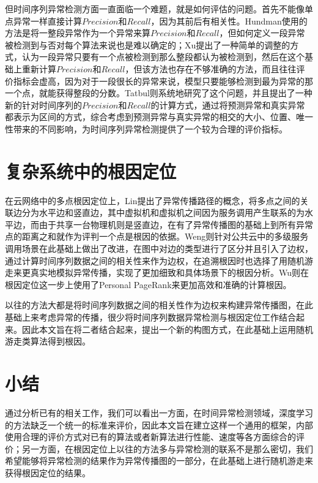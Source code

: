 但时间序列异常检测方面一直面临一个难题，就是如何评估的问题。首先不能像单点异常一样直接计算$Precision$和$Recall$，因为其前后有相关性。Hundman\cite{DBLP:conf/kdd/HundmanCLCS18}使用的方法是将一整段异常作为一个异常来算$Precision$和$Recall$，但如何定义一段异常被检测到与否对每个算法来说也是难以确定的；Xu\cite{xu2018unsupervised}提出了一种简单的调整的方式，认为一段异常只要有一个点被检测到那么整段都认为被检测到，然后在这个基础上重新计算$Precision$和$Recall$，但该方法也存在不够准确的方法，而且往往评价指标会虚高，因为对于一段很长的异常来说，模型只要能够检测到最为异常的那一个点，就能获得整段的分数。Tatbul\cite{tatbul2018precision}则系统地研究了这个问题，并且提出了一种新的针对时间序列的$Precision$和$Recall$的计算方式，通过将预测异常和真实异常都表示为区间的方式，综合考虑到预测异常与真实异常的相交的大小、位置、唯一性带来的不同影响，为时间序列异常检测提供了一个较为合理的评价指标。

\section{复杂系统中的根因定位}

在云网络中的多点根因定位上，Lin\cite{lin2016automated}提出了异常传播路径的概念，将多点之间的关联边分为水平边和竖直边，其中虚拟机和虚拟机之间因为服务调用产生联系的为水平边，而由于共享一台物理机则是竖直边，在有了异常传播图的基础上到所有异常点的距离之和就作为评判一个点是根因的依据。Weng\cite{weng2018root}则针对公共云中的多级服务调用场景在此基础上做出了改进，在图中对边的类型进行了区分并且引入了边权，通过计算时间序列数据之间的相关性来作为边权，在追溯根因时也选择了用随机游走来更真实地模拟异常传播，实现了更加细致和具体场景下的根因分析。Wu\cite{wu2020microrca}则在根因定位这一步上使用了Personal PageRank来更加高效和准确的计算根因。

以往的方法大都是将时间序列数据之间的相关性作为边权来构建异常传播图，在此基础上来考虑异常的传播，很少将时间序列数据异常检测与根因定位工作结合起来。因此本文旨在将二者结合起来，提出一个新的构图方式，在此基础上运用随机游走类算法得到根因。

\section{小结}
通过分析已有的相关工作，我们可以看出一方面，在时间异常检测领域，深度学习的方法缺乏一个统一的标准来评价，因此本文旨在建立这样一个通用的框架，内部使用合理的评价方式对已有的算法或者新算法进行性能、速度等各方面综合的评价；另一方面，在根因定位上以往的方法多与异常检测的联系不是那么密切，我们希望能够将异常检测的结果作为异常传播图的一部分，在此基础上进行随机游走来获得根因定位的结果。

